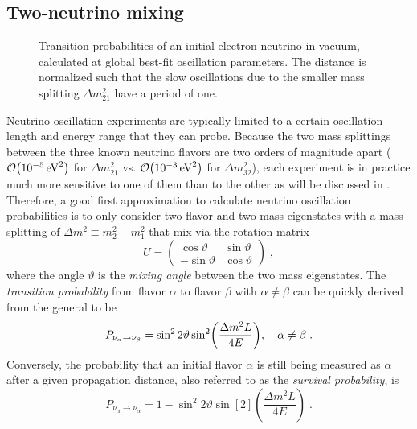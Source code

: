 \subsection{Two-neutrino mixing}
\begin{figure}
    \centering
    
    \caption{Transition probabilities of an initial electron neutrino in vacuum, calculated at global best-fit\cite{nufit40} oscillation parameters. The distance is normalized such that the slow oscillations due to the smaller mass splitting $\Delta m^2_{21}$ have a period of one.\label{fig:simple-oscillogram}}
\end{figure}
Neutrino oscillation experiments are typically limited to a certain oscillation length and energy range that they can probe. Because the two mass splittings between the three known neutrino flavors are two orders of magnitude apart ($\order{\SI{e-5}{eV^2}}$ for $\Delta m^2_{21}$ vs. $\order{\SI{e-3}{eV^2}}$ for $\Delta m^2_{32}$), each experiment is in practice much more sensitive to one of them than to the other as will be discussed in .
Therefore, a good first approximation to calculate neutrino oscillation probabilities is to only consider two flavor and two mass eigenstates with a mass splitting of $\Delta m^2 \equiv m_2^2 - m_1^2$ that mix via the rotation matrix
\begin{equation}
    U =
    \begin{pmatrix}
        \cos \vartheta & \sin \vartheta \\
        -\sin \vartheta & \cos \vartheta
    \end{pmatrix}\;,\label{eq:two-flav-pmns}
\end{equation}
where the angle $\vartheta$ is the \emph{mixing angle} between the two mass eigenstates.
The \emph{transition probability} from flavor $\alpha$ to flavor $\beta$ with $\alpha \neq \beta$ can be quickly derived from the general  to be
\begin{equation}
    P_{\nu_\alpha \rightarrow \nu_\beta} = \sin^2 2\vartheta \sin[2](\frac{\Delta m^2L}{4E})\qc\alpha \neq \beta\;.
\end{equation}
Conversely, the probability that an initial flavor $\alpha$ is still being measured as $\alpha$ after a given propagation distance, also referred to as the \emph{survival probability}, is
\begin{equation}
    P_{\nu_\alpha \rightarrow \nu_\alpha} = 1 - \sin^2 2\vartheta \sin[2](\frac{\Delta m^2L}{4E})\;.
\end{equation}

